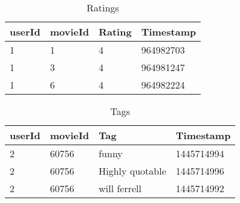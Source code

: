 \documentclass{article}
\begin{document}

\begin{table}[h]
\caption{Ratings}
\centering
\begin{tabular}{llll}
\toprule
userId & movieId & Rating & Timestamp \\
\midrule
1 & 1 & 4 & 964982703 \\
1 & 3 & 4 & 964981247 \\
1 & 6 & 4 & 964982224 \\
\bottomrule
\end{tabular}
\label{tab:table1}
\end{table}

\begin{table} [h]
\caption{Tags}
\centering
\begin{tabular}{llll}
\toprule
userId & movieId & Tag & Timestamp \\
\midrule
2 & 60756 & funny & 1445714994 \\
2 & 60756 & Highly quotable & 1445714996 \\
2 & 60756 & will ferrell & 1445714992 \\
\bottomrule
\end{tabular}
\label{tab:table2}
\end{table}







%
%
%
%
%
%
\end{document}
